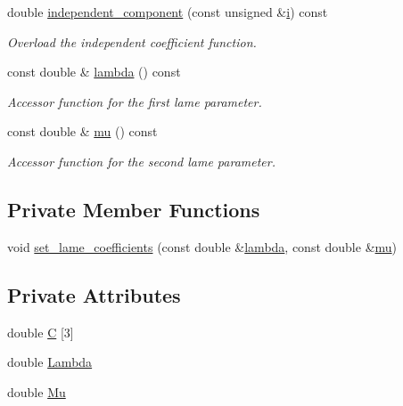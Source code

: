 \begin{DoxyCompactItemize}
double \hyperlink{classoomph_1_1DeviatoricIsotropicElasticityTensor_ab9861d265cbc24c5fa6b55f0613ead8b}{independent\+\_\+component} (const unsigned \&\hyperlink{cfortran_8h_adb50e893b86b3e55e751a42eab3cba82}{i}) const
\begin{DoxyCompactList}\small\item\em Overload the independent coefficient function. \end{DoxyCompactList}\item 
const double \& \hyperlink{classoomph_1_1DeviatoricIsotropicElasticityTensor_a6fe87541b96eae240e41bc71515500b1}{lambda} () const
\begin{DoxyCompactList}\small\item\em Accessor function for the first lame parameter. \end{DoxyCompactList}\item 
const double \& \hyperlink{classoomph_1_1DeviatoricIsotropicElasticityTensor_ab460459ac81142a79e16ef2229d04b43}{mu} () const
\begin{DoxyCompactList}\small\item\em Accessor function for the second lame parameter. \end{DoxyCompactList}\end{DoxyCompactItemize}
\subsection*{Private Member Functions}
\begin{DoxyCompactItemize}
\item 
void \hyperlink{classoomph_1_1DeviatoricIsotropicElasticityTensor_a0f1da5acf9260a1827c15593a0cdec2d}{set\+\_\+lame\+\_\+coefficients} (const double \&\hyperlink{classoomph_1_1DeviatoricIsotropicElasticityTensor_a6fe87541b96eae240e41bc71515500b1}{lambda}, const double \&\hyperlink{classoomph_1_1DeviatoricIsotropicElasticityTensor_ab460459ac81142a79e16ef2229d04b43}{mu})
\end{DoxyCompactItemize}
\subsection*{Private Attributes}
\begin{DoxyCompactItemize}
\item 
double \hyperlink{classoomph_1_1DeviatoricIsotropicElasticityTensor_a3ddaeb8b6b4c01c3227d09962e495060}{C} \mbox{[}3\mbox{]}
\item 
double \hyperlink{classoomph_1_1DeviatoricIsotropicElasticityTensor_a0a05cc242a795eb8fbcfa51474aaf318}{Lambda}
\item 
double \hyperlink{classoomph_1_1DeviatoricIsotropicElasticityTensor_aafe9bd480de84c98cfe1528ff7a3c528}{Mu}
\end{DoxyCompactItemize}
